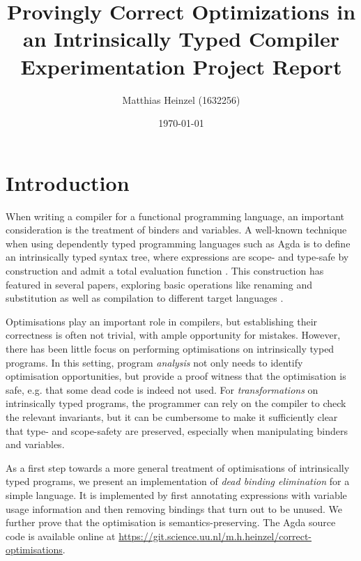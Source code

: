 \documentclass[11pt,a4paper]{article}
\title{Provingly Correct Optimizations in an Intrinsically Typed Compiler\\
  \vspace{1cm}
  \large Experimentation Project Report}
\author{Matthias Heinzel (1632256)}
\date{\today}
\newcommand{\Draft}[1]{{\color{gray}(#1)}}
\begin{document}
\maketitle
\tableofcontents


\section{Introduction}

When writing a compiler for a functional programming language,
an important consideration is the treatment of binders and variables.
A well-known technique when using dependently typed programming languages such as Agda
\cite{norell2007agda}
is to define an intrinsically typed syntax tree,
where expressions are scope- and type-safe by construction and admit a total evaluation function
\cite{augustsson1999intrinsic}.
This construction has featured in several papers, exploring
basic operations like renaming and substitution
\cite{allais2018universe}
as well as compilation to different target languages
\cite[supplemental material]{pickard2021calculating}.

Optimisations play an important role in compilers, but
establishing their correctness is often not trivial,
with ample opportunity for mistakes.
However, there has been little focus on performing optimisations on intrinsically typed programs.
%
In this setting, program \emph{analysis} not only needs to identify optimisation opportunities,
but provide a proof witness that the optimisation is safe,
e.g. that some dead code is indeed not used.
For \emph{transformations} on intrinsically typed programs,
the programmer can rely on the compiler to check the relevant invariants,
but it can be cumbersome to make it sufficiently clear that type- and scope-safety are preserved,
especially when manipulating binders and variables.

As a first step towards a more general treatment of optimisations of intrinsically typed programs,
we present an implementation of \emph{dead binding elimination} for a simple language.
It is implemented by first annotating expressions with variable usage information
and then removing bindings that turn out to be unused.
We further prove that the optimisation is semantics-preserving.
The Agda source code is available online at
\url{https://git.science.uu.nl/m.h.heinzel/correct-optimisations}.
\end{document}
